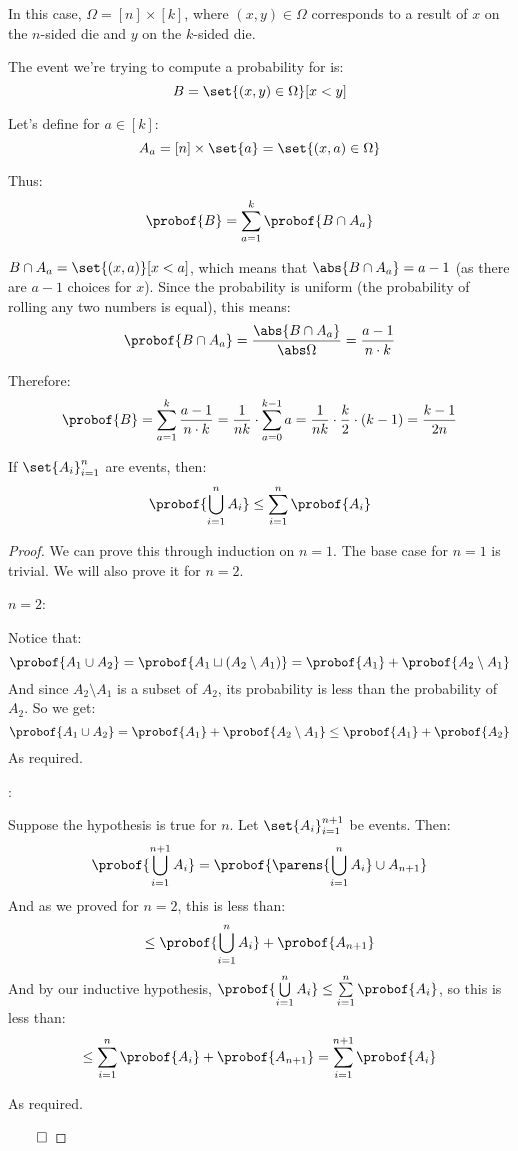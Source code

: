 \begin{blankpp}

In this case, $\Omega=[n]\times[k]$, where $(x,y)\in\Omega$ corresponds to a result of $x$ on the $n$-sided die and $y$
on the $k$-sided die.

The event we're trying to compute a probability for is:
\[ B = \set{(x,y)\in\Omega}[x<y] \]

Let's define for $a\in[k]$:
\[ A_a = [n]\times\set{a} = \set{(x,a)\in\Omega} \]

Thus:
\[ \probof{B} = \sum_{a=1}^k \probof{B\cap A_a} \]

$B\cap A_a=\set{(x,a)}[x<a]$, which means that $\abs{B\cap A_a}=a-1$ (as there are $a-1$ choices for $x$).
Since the probability is uniform (the probability of rolling any two numbers is equal), this means:
\[ \probof{B\cap A_a} = \frac{\abs{B\cap A_a}}{\abs\Omega} = \frac{a-1}{n\cdot k} \]

Therefore:
\[ \probof{B} = \sum_{a=1}^k \frac{a-1}{n\cdot k} = \frac1{nk}\cdot\sum_{a=0}^{k-1}a =
   \frac{1}{nk}\cdot\frac k2\cdot(k-1) = \frac{k-1}{2n} \]

\end{blankpp}

\begin{lemm*}[finiteUnionBoundLemma]

	If $\set{A_i}_{i=1}^n$ are events, then:
	\[ \probof{\bigcup_{i=1}^n A_i}\leq\sum_{i=1}^n\probof{A_i} \]

\end{lemm*}

\begin{proof}

	We can prove this through induction on $n=1$. The base case for $n=1$ is trivial.
	We will also prove it for $n=2$.

	 $n=2$:

	Notice that:
	\[ \probof{A_1\cup A_2} = \probof{A_1\sqcup(A_2\setminus A_1)} = \probof{A_1} + \probof{A_2\setminus A_1} \]
	And since $A_2\setminus A_1$ is a subset of $A_2$, its probability is less than the probability of $A_2$.
	So we get:
	\[ \probof{A_1\cup A_2} = \probof{A_1} + \probof{A_2\setminus A_1} \leq \probof{A_1} + \probof{A_2} \]
	As required.

	:

	Suppose the hypothesis is true for $n$.
	Let $\set{A_i}_{i=1}^{n+1}$ be events.
	Then:
	\[ \probof{\bigcup_{i=1}^{n+1} A_i} = \probof{\parens{\bigcup_{i=1}^n A_i}\cup A_{n+1}} \]
	And as we proved for $n=2$, this is less than:
	\[ \leq \probof{\bigcup_{i=1}^n A_i} + \probof{A_{n+1}} \]
	And by our inductive hypothesis, $\probof{\bigcup\limits_{i=1}^n A_i}\leq\sum\limits_{i=1}^n\probof{A_i}$, so this is 
	less than:
	\[ \leq \sum_{i=1}^n\probof{A_i} + \probof{A_{n+1}} = \sum_{i=1}^{n+1}\probof{A_i} \]

	As required.

\hfill$\qed$

\end{proof}

